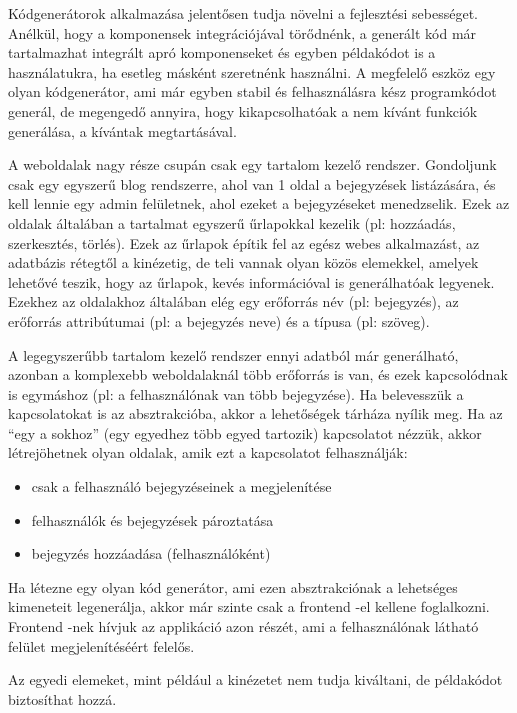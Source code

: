 \documentclass[a4paper,12pt,oneside]{report}
\begin{document}
\begin{justify}

	Kódgenerátorok alkalmazása jelentősen tudja növelni a fejlesztési sebességet. Anélkül, hogy a komponensek integrációjával törődnénk, a generált kód már tartalmazhat integrált apró komponenseket és egyben példakódot is a használatukra, ha esetleg másként szeretnénk használni. A megfelelő eszköz egy olyan kódgenerátor, ami már egyben stabil és felhasználásra kész programkódot generál, de megengedő annyira, hogy kikapcsolhatóak a nem kívánt funkciók generálása, a kívántak megtartásával.

	A weboldalak nagy része csupán csak egy tartalom kezelő rendszer. Gondoljunk csak egy egyszerű blog rendszerre, ahol van 1 oldal a bejegyzések listázására, és kell lennie egy admin felületnek, ahol ezeket a bejegyzéseket menedzselik. Ezek az oldalak általában a tartalmat egyszerű űrlapokkal kezelik (pl: hozzáadás, szerkesztés, törlés). Ezek az űrlapok építik fel az egész webes alkalmazást, az adatbázis rétegtől a kinézetig, de teli vannak olyan közös elemekkel, amelyek lehetővé teszik, hogy az űrlapok, kevés információval is generálhatóak legyenek. Ezekhez az oldalakhoz általában elég egy erőforrás név (pl: bejegyzés), az erőforrás attribútumai (pl: a bejegyzés neve) és a típusa (pl: szöveg). 

	A legegyszerűbb tartalom kezelő rendszer ennyi adatból már generálható, azonban a komplexebb weboldalaknál több erőforrás is van, és ezek kapcsolódnak is egymáshoz (pl: a felhasználónak van több bejegyzése). Ha belevesszük a kapcsolatokat is az absztrakcióba, akkor a lehetőségek tárháza nyílik meg. Ha az “egy a sokhoz” (egy egyedhez több egyed tartozik) kapcsolatot nézzük, akkor létrejöhetnek olyan oldalak, amik ezt a kapcsolatot felhasználják:

	\begin{itemize}
		\item csak a felhasználó bejegyzéseinek a megjelenítése
		\item felhasználók és bejegyzések pároztatása
		\item bejegyzés hozzáadása (felhasználóként)
	\end{itemize}

	Ha létezne egy olyan kód generátor, ami ezen absztrakciónak a lehetséges kimeneteit legenerálja, akkor már szinte csak a frontend -el kellene foglalkozni. Frontend -nek hívjuk az applikáció azon részét, ami a felhasználónak látható felület megjelenítéséért felelős. 

	Az egyedi elemeket, mint például a kinézetet nem tudja kiváltani, de példakódot biztosíthat hozzá.


\end{justify}
\end{document}
